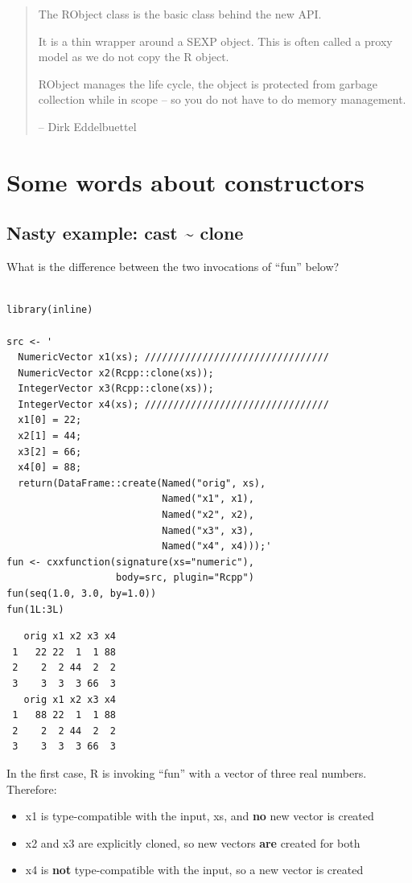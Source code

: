\documentclass[11pt]{article}
\begin{document}
\begin{quote}

The RObject class is the basic class behind the new API.

It is a thin wrapper around a SEXP object.  This is often called a
proxy model as we do not copy the R object.

RObject manages the life cycle, the object is protected from
garbage collection while in scope -- so you do not have to do
memory management.

-- Dirk Eddelbuettel


\end{quote}
\section{Some words about constructors}
\label{sec-5}
\subsection{Nasty example: cast \~{} clone}
\label{sec-5-1}


What is the difference between the two invocations of ``fun'' below?


\begin{verbatim}

library(inline)

src <- '
  NumericVector x1(xs); ////////////////////////////////
  NumericVector x2(Rcpp::clone(xs));
  IntegerVector x3(Rcpp::clone(xs));
  IntegerVector x4(xs); ////////////////////////////////
  x1[0] = 22;
  x2[1] = 44;
  x3[2] = 66;
  x4[0] = 88;
  return(DataFrame::create(Named("orig", xs),
                           Named("x1", x1),
                           Named("x2", x2),
                           Named("x3", x3),
                           Named("x4", x4)));'
fun <- cxxfunction(signature(xs="numeric"),
                   body=src, plugin="Rcpp")
fun(seq(1.0, 3.0, by=1.0))
fun(1L:3L)
\end{verbatim}

\begin{verbatim}
   orig x1 x2 x3 x4
 1   22 22  1  1 88
 2    2  2 44  2  2
 3    3  3  3 66  3
   orig x1 x2 x3 x4
 1   88 22  1  1 88
 2    2  2 44  2  2
 3    3  3  3 66  3
\end{verbatim}

In the first case, R is invoking ``fun'' with a vector of three real
numbers.  Therefore:

\begin{itemize}
\item x1 is type-compatible with the input, xs, and \textbf{no} new vector is
    created
\item x2 and x3 are explicitly cloned, so new vectors \textbf{are} created for
    both
\item x4 is \textbf{not} type-compatible with the input, so a new vector is
    created
\end{itemize}
\end{document}
